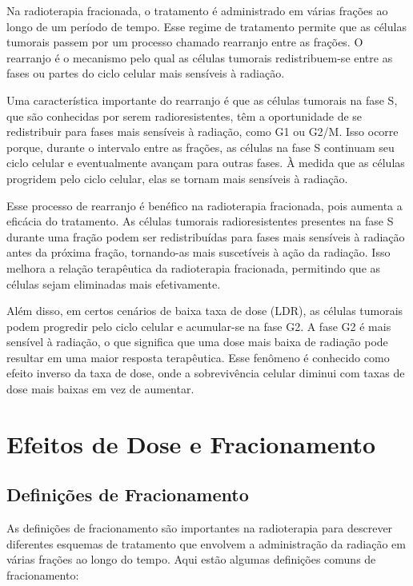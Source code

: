 \documentclass[11pt,a4paper]{article}
\begin{document}
	Na radioterapia fracionada, o tratamento é administrado em várias frações ao longo de um período de tempo. Esse regime de tratamento permite que as células tumorais passem por um processo chamado rearranjo entre as frações. O rearranjo é o mecanismo pelo qual as células tumorais redistribuem-se entre as fases ou partes do ciclo celular mais sensíveis à radiação.

	Uma característica importante do rearranjo é que as células tumorais na fase S, que são conhecidas por serem radioresistentes, têm a oportunidade de se redistribuir para fases mais sensíveis à radiação, como G1 ou G2/M. Isso ocorre porque, durante o intervalo entre as frações, as células na fase S continuam seu ciclo celular e eventualmente avançam para outras fases. À medida que as células progridem pelo ciclo celular, elas se tornam mais sensíveis à radiação.

	Esse processo de rearranjo é benéfico na radioterapia fracionada, pois aumenta a eficácia do tratamento. As células tumorais radioresistentes presentes na fase S durante uma fração podem ser redistribuídas para fases mais sensíveis à radiação antes da próxima fração, tornando-as mais suscetíveis à ação da radiação. Isso melhora a relação terapêutica da radioterapia fracionada, permitindo que as células sejam eliminadas mais efetivamente.

	Além disso, em certos cenários de baixa taxa de dose (LDR), as células tumorais podem progredir pelo ciclo celular e acumular-se na fase G2. A fase G2 é mais sensível à radiação, o que significa que uma dose mais baixa de radiação pode resultar em uma maior resposta terapêutica. Esse fenômeno é conhecido como efeito inverso da taxa de dose, onde a sobrevivência celular diminui com taxas de dose mais baixas em vez de aumentar.

\section{Efeitos de Dose e Fracionamento}

\subsection{Definições de Fracionamento}

	As definições de fracionamento são importantes na radioterapia para descrever diferentes esquemas de tratamento que envolvem a administração da radiação em várias frações ao longo do tempo. Aqui estão algumas definições comuns de fracionamento:
\end{document}
